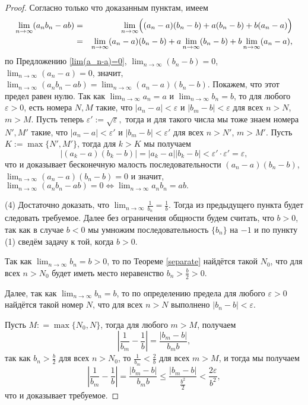 \begin{proof}
    Согласно только что доказанным пунктам, имеем
    \begin{eqnarray*}
     \lim_{n\to \infty}(a_nb_n - ab) &=&  \lim_{n\to \infty}\Bigl( (a_n-a)(b_n-b) + a(b_n -b) + b(a_n -a) \Bigr)  \\
    &=&  \lim_{n\to \infty} (a_n-a)(b_n-b) + a \lim_{n\to \infty}(b_n -b) + b \lim_{n\to \infty}(a_n -a),
    \end{eqnarray*}
по Предложению \ref{lim(a_n-a)=0}, $\lim_{n\to \infty}(b_n -b) =0$, $\lim_{n\to \infty}(a_n -a)=0$, значит, $\lim_{n\to \infty}(a_nb_n - ab) = \lim_{n \to \infty}(a_n-a)(b_n-b).$ Покажем, что этот предел равен нулю. Так как $\lim_{n\to \infty} a_n  =a$ и $\lim_{n\to \infty}b_n =b$, то для любого $\varepsilon>0$, есть номера $N,M$ такие, что $|a_n - a| <\varepsilon$ и $|b_m -b| < \varepsilon$ для всех $n >N$, $m>M$. Пусть теперь $\varepsilon':=\sqrt{\varepsilon},$ тогда и для такого числа мы тоже знаем номера $N',M'$ такие, что  $|a_n - a| <\varepsilon'$ и $|b_m -b| < \varepsilon'$ для всех $n >N'$, $m>M'$. Пусть $K:= \max\{N',M'\}$, тогда для $k>K$ мы получаем
\[
 |(a_k-a)(b_k-b)| = |a_k -a||b_k - b| < \varepsilon' \cdot \varepsilon' = \varepsilon, 
\]
что и доказывает бесконечную малость последовательности $(a_n-a)(b_n-b)$, \ie $\lim_{n \to \infty}(a_n-a)(b_n-b) = 0$ и значит, $\lim_{n\to \infty}(a_nb_n - ab) = 0 \Longleftrightarrow \lim_{n\to \infty}a_nb_n = ab.$

(4) Достаточно доказать, что $\lim_{n \to \infty} \frac{1}{b_n} = \frac{1}{b}$. Тогда из предыдущего пункта будет следовать требуемое. Далее без ограничения общности будем считать, что $b>0$, так как в случае $b<0$ мы умножим последовательность $\{b_n\}$ на $-1$ и по пункту (1) сведём задачу к той, когда $b>0.$

Так как $\lim_{n\to \infty} b_n =b>0$, то по Теореме \ref{separate} найдётся такой $N_0$, что для всех $n>N_0$ будет иметь место неравенство $b_n > \frac{b}{2}>0$. 

Далее, так как $\lim_{n\to \infty} b_n =b$, то по определению предела для любого $\varepsilon>0$ найдётся такой номер $N$, что для всех $n>N$ выполнено $|b_n - b|<\varepsilon.$

Пусть $M: = \max\{N_0, N\}$, тогда для любого $m>M$, получаем
\[
\left| \frac{1}{b_m} - \frac{1}{b} \right| = \frac{|b_m-b|}{b_mb},
\]
так как $b_n >\frac{b}{2}$ для всех $n>N_0$, то $\frac{1}{b_m} < \frac{2}{b}$ для всех $m >M$, и тогда мы получаем 
\[
\left| \frac{1}{b_m} - \frac{1}{b} \right| = \frac{|b_m-b|}{b_mb} \le \frac{|b_m-b|}{\frac{b^2}{2}} < \frac{2\varepsilon}{b^2},
\]
что и доказывает требуемое.
\end{proof}

